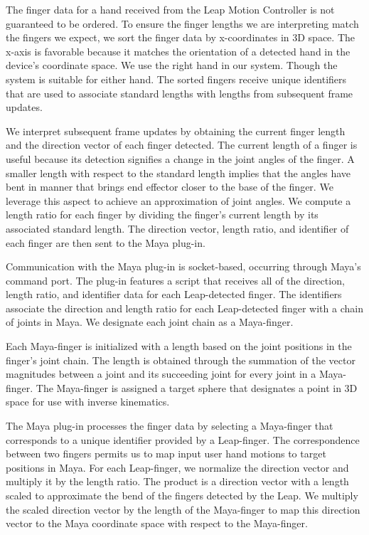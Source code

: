 \documentclass[review]{acmsiggraph}
\begin{document}
The finger data for a hand received from the Leap Motion Controller is not guaranteed to be ordered. To ensure the finger lengths we are interpreting match the fingers we expect, we sort the finger data by x-coordinates in 3D space. The x-axis is favorable because it matches the orientation of a detected hand in the device's coordinate space. We use the right hand in our system. Though the system is suitable for either hand. The sorted fingers receive unique identifiers that are used to associate standard lengths with lengths from subsequent frame updates. 

We interpret subsequent frame updates by obtaining the current finger length and the direction vector of each finger detected. The current length of a finger is useful because its detection signifies a change in the joint angles of the finger. A smaller length with respect to the standard length implies that the angles have bent in manner that brings end effector closer to the base of the finger. We leverage this aspect to achieve an approximation of joint angles. We compute a length ratio for each finger by dividing the finger's current length by its associated standard length. The direction vector, length ratio, and identifier of each finger are then sent to the Maya plug-in.

Communication with the Maya plug-in is socket-based, occurring through Maya's command port. The plug-in features a script that receives all of the direction, length ratio, and identifier data for each Leap-detected finger. The identifiers associate the direction and length ratio for each Leap-detected finger with a chain of joints in Maya. We designate each joint chain as a Maya-finger. 

Each Maya-finger is initialized with a length based on the joint positions in the finger's joint chain. The length is obtained through the summation of the vector magnitudes between a joint and its succeeding joint for every joint in a Maya-finger. The Maya-finger is assigned a target sphere that designates a point in 3D space for use with inverse kinematics. 

The Maya plug-in processes the finger data by selecting a Maya-finger that corresponds to a unique identifier provided by a Leap-finger. The correspondence between two fingers permits us to map input user hand motions to target positions in Maya. For each Leap-finger, we normalize the direction vector and multiply it by the length ratio. The product is a direction vector with a length scaled to approximate the bend of the fingers detected by the Leap. We multiply the scaled direction vector by the length of the Maya-finger to map this direction vector to the Maya coordinate space with respect to the Maya-finger. 
\end{document}
